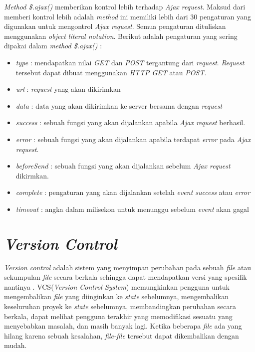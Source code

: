 \textit{Method \$.ajax()} memberikan kontrol lebih terhadap \textit{Ajax request}. Maksud dari memberi kontrol lebih adalah \textit{method} ini memiliki lebih dari 30 pengaturan yang digunakan untuk mengontrol \textit{Ajax request}. Semua pengaturan dituliskan menggunakan \textit{object literal notation}. Berikut adalah pengaturan yang sering dipakai dalam \textit{method \$.ajax()} :

\begin{itemize}
	\item \textit{type} : mendapatkan nilai \textit{GET} dan \textit{POST} tergantung dari \textit{request}. \textit{Request} tersebut dapat dibuat menggunakan \textit{HTTP GET} atau \textit{POST}.
	\item \textit{url} : \textit{request} yang akan dikirimkan
	\item \textit{data} : data yang akan dikirimkan ke server bersama dengan \textit{request}
	\item \textit{success} : sebuah fungsi yang akan dijalankan apabila \textit{Ajax request} berhasil. 
	\item \textit{error} : sebuah fungsi yang akan dijalankan apabila terdapat \textit{error} pada \textit{Ajax request}. 
	\item \textit{beforeSend} : sebuah fungsi yang akan dijalankan sebelum \textit{Ajax request} dikirmkan.
	\item \textit{complete} : pengaturan yang akan dijalankan setelah \textit{event success} atau \textit{error}
	\item \textit{timeout} : angka dalam milisekon untuk menunggu sebelum \textit{event} akan gagal
\end{itemize}

\section{\textit{Version Control}}
\label{sec:version}

\textit{Version control} adalah sistem yang menyimpan perubahan pada sebuah \textit{file} atau sekumpulan \textit{file} secara berkala sehingga dapat mendapatkan versi yang spesifik nantinya \cite{chacon2014pro}. VCS(\textit{Version Control System}) memungkinkan pengguna untuk mengembalikan \textit{file} yang diinginkan ke \textit{state} sebelumnya, mengembalikan keseluruhan proyek ke \textit{state} sebelumnya, membandingkan perubahan secara berkala, dapat melihat pengguna terakhir yang memodifikasi sesuatu yang menyebabkan masalah, dan masih banyak lagi. Ketika beberapa \textit{file} ada yang hilang karena sebuah kesalahan, \textit{file-file} tersebut dapat dikembalikan dengan mudah. 

